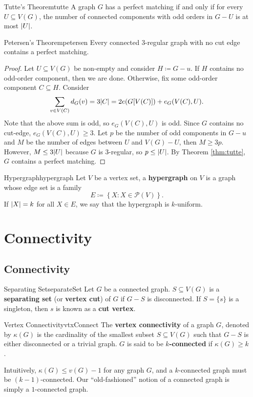 \documentclass[math, code]{amznotes}
\theoremstyle{remark}
\begin{document}
\begin{thmbox}{Tutte's Theorem}{tutte}
    A graph $G$ has a perfect matching if and only if for every $U \subseteq V(G)$, the number of connected components with odd orders in $G - U$ is at most ${\left\lvert {U} \right\rvert}$.
\end{thmbox}
\begin{thmbox}{Petersen's Theorem}{petersen}
    Every connected $3$-regular graph with no cut edge contains a perfect matching.
    \tcblower
    \begin{proof}
        Let $U \subseteq V(G)$ be non-empty and consider $H \coloneqq G - u$. If $H$ contains no odd-order component, then we are done. Otherwise, fix some odd-order component $C \subseteq H$. Consider
        \begin{equation*}
            \sum_{v \in V(C)}d_G(v) = 3{\left\lvert {C} \right\rvert} = 2e(G[V(C)]) + e_G(V(C), U).
        \end{equation*}
        Note that the above sum is odd, so $e_G(V(C), U)$ is odd. Since $G$ contains no cut-edge, $e_G(V(C), U) \geq 3$. Let $p$ be the number of odd components in $G - u$ and $M$ be the number of edges between $U$ and $V(G) - U$, then $M \geq 3p$. However, $M \leq 3{\left\lvert {U} \right\rvert}$ because $G$ is $3$-regular, so $p \leq {\left\lvert {U} \right\rvert}$. By Theorem \ref{thm:tutte}, $G$ contains a perfect matching.
    \end{proof}
\end{thmbox}
\begin{dfnbox}{Hypergraph}{hypergraph}
    Let $V$ be a vertex set, a {\color{red} \textbf{hypergraph}} on $V$ is a graph whose edge set is a family
    \begin{equation*}
        E \coloneqq \left\{X \colon X \in \mathcal{P}(V)\right\}.
    \end{equation*}
    If ${\left\lvert {X} \right\rvert} = k$ for all $X \in E$, we say that the hypergraph is $k$-uniform.
\end{dfnbox}
\chapter{Connectivity}
\section{Connectivity}
\begin{dfnbox}{Separating Set}{separateSet}
    Let $G$ be a connected graph. $S \subseteq V(G)$ is a {\color{red} \textbf{separating set}} (or {\color{red} \textbf{vertex cut}}) of $G$ if $G - S$ is disconnected. If $S = \{s\}$ is a singleton, then $s$ is known as a {\color{red} \textbf{cut vertex}}.
\end{dfnbox}
\begin{dfnbox}{Vertex Connectivity}{vtxConnect}
    The {\color{red} \textbf{vertex connectivity}} of a graph $G$, denoted by $\kappa(G)$ is the cardinality of the smallest subset $S \subseteq V(G)$ such that $G - S$ is either disconnected or a trivial graph. $G$ is said to be {\color{red} \textbf{$k$-connected}} if $\kappa(G) \geq k$.
\end{dfnbox}
Intuitively, $\kappa(G) \leq v(G) - 1$ for any graph $G$, and a $k$-connected graph must be $(k - 1)$-connected. Our ``old-fashioned'' notion of a connected graph is simply a $1$-connected graph.
\end{document}
